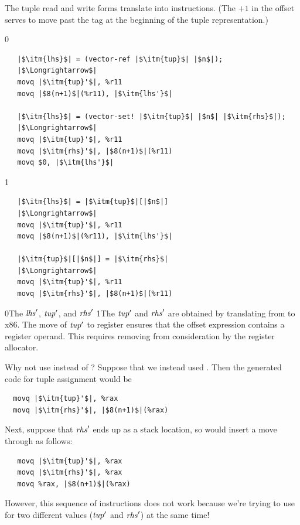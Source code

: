 \documentclass[7x10]{TimesAPriori_MIT}%
\def\racketEd{0}
\def\pythonEd{1}
\def\edition{1}
\newcommand{\racket}[1]{{\if\edition\racketEd{#1}\fi}}
\newcommand{\pythonColor}[0]{}
\newcommand{\python}[1]{{\if\edition\pythonEd\pythonColor #1\fi}}
\numberwithin{theorem}{chapter}
\numberwithin{definition}{chapter}
\numberwithin{equation}{chapter}
\begin{document}
The tuple read and write forms translate into 
instructions.  (The $+1$ in the offset serves to move past the tag at the
beginning of the tuple representation.)
%
\begin{center}
\begin{minipage}{\textwidth}
{\if\edition\racketEd    
\begin{lstlisting}
   |$\itm{lhs}$| = (vector-ref |$\itm{tup}$| |$n$|);
   |$\Longrightarrow$|
   movq |$\itm{tup}'$|, %r11
   movq |$8(n+1)$|(%r11), |$\itm{lhs'}$|

   |$\itm{lhs}$| = (vector-set! |$\itm{tup}$| |$n$| |$\itm{rhs}$|);
   |$\Longrightarrow$|
   movq |$\itm{tup}'$|, %r11
   movq |$\itm{rhs}'$|, |$8(n+1)$|(%r11)
   movq $0, |$\itm{lhs'}$|
\end{lstlisting}
\fi}
{\if\edition\pythonEd\pythonColor    
\begin{lstlisting}
   |$\itm{lhs}$| = |$\itm{tup}$|[|$n$|]
   |$\Longrightarrow$|
   movq |$\itm{tup}'$|, %r11
   movq |$8(n+1)$|(%r11), |$\itm{lhs'}$|

   |$\itm{tup}$|[|$n$|] = |$\itm{rhs}$|
   |$\Longrightarrow$|
   movq |$\itm{tup}'$|, %r11
   movq |$\itm{rhs}'$|, |$8(n+1)$|(%r11)
\end{lstlisting}
\fi}
\end{minipage}
\end{center}
\racket{The $\mathit{lhs}'$, $\mathit{tup}'$, and $\mathit{rhs}'$}
\python{The $\mathit{tup}'$ and $\mathit{rhs}'$}
are obtained by translating from \LangCVec{} to x86.
%
The move of $\mathit{tup}'$ to
register  ensures that the offset expression
 contains a register operand.  This requires
removing  from consideration by the register allocator.

Why not use  instead of ? Suppose that we instead used
. Then the generated code for tuple assignment would be
\begin{lstlisting}
  movq |$\itm{tup}'$|, %rax
  movq |$\itm{rhs}'$|, |$8(n+1)$|(%rax)
\end{lstlisting}
Next, suppose that $\mathit{rhs}'$ ends up as a stack location, so
 would insert a move through 
as follows:
\begin{lstlisting}
   movq |$\itm{tup}'$|, %rax
   movq |$\itm{rhs}'$|, %rax
   movq %rax, |$8(n+1)$|(%rax)
\end{lstlisting}
However, this sequence of instructions does not work because we're
trying to use  for two different values ($\mathit{tup}'$ and
$\mathit{rhs}'$) at the same time!
\end{document}
